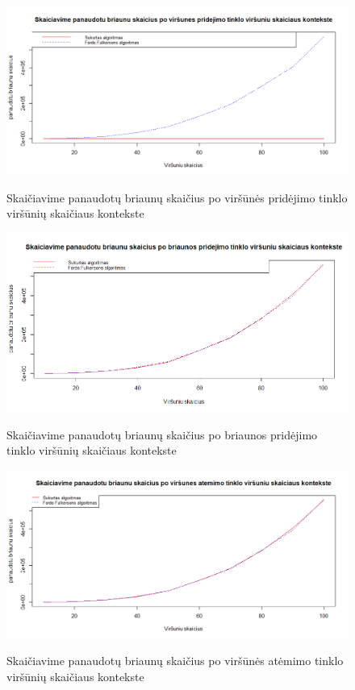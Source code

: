 \begin{figure}[H]
	\caption{Skaičiavime panaudotų briaunų skaičius po viršūnės pridėjimo tinklo viršūnių skaičiaus kontekste}
	\centering
	\includegraphics[width=\textwidth]{img/vav.png}
	\label{plot:vav}
\end{figure}
\begin{figure}[H]
	\caption{Skaičiavime panaudotų briaunų skaičius po briaunos pridėjimo tinklo viršūnių skaičiaus kontekste}
	\centering
	\includegraphics[width=\textwidth]{img/vae.png}
	\label{plot:vae}
\end{figure}
\begin{figure}[H]
	\caption{Skaičiavime panaudotų briaunų skaičius po viršūnės atėmimo tinklo viršūnių skaičiaus kontekste}
	\centering
	\includegraphics[width=\textwidth]{img/vrv.png}
	\label{plot:vrv}
\end{figure}
